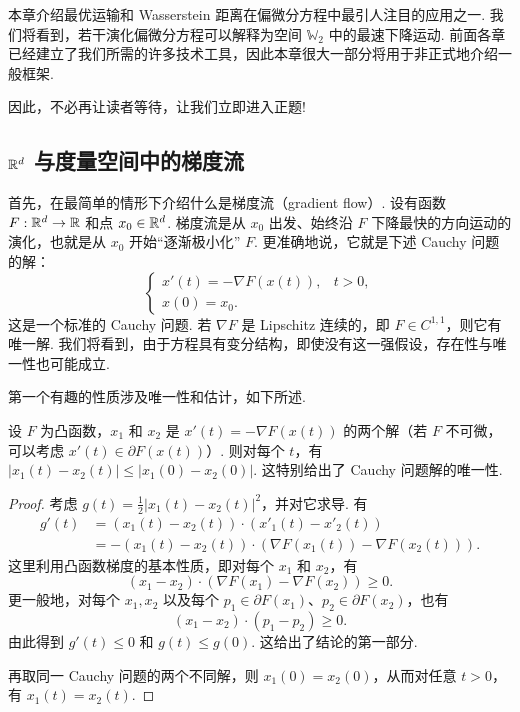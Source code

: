 本章介绍最优运输和 Wasserstein 距离在偏微分方程中最引人注目的应用之一. 我们将看到，若干演化偏微分方程可以解释为空间 $\mathbb W_2$ 中的最速下降运动. 前面各章已经建立了我们所需的许多技术工具，因此本章很大一部分将用于非正式地介绍一般框架.

因此，不必再让读者等待，让我们立即进入正题!

\subsection[欧氏空间与度量空间中的梯度流]{$\mathbb R^d$ 与度量空间中的梯度流}\label{sec:8.1}
首先，在最简单的情形下介绍什么是梯度流（gradient flow）. 设有函数 $F:\mathbb R^d\to\mathbb R$ 和点 $x_0\in\mathbb R^d$. 梯度流是从 $x_0$ 出发、始终沿 $F$ 下降最快的方向运动的演化，也就是从 $x_0$ 开始“逐渐极小化” $F$. 更准确地说，它就是下述 Cauchy 问题的解：
\[
\begin{cases}
x'(t)=-\nabla F(x(t)),&t>0,\\
x(0)=x_0.
\end{cases}
\]
这是一个标准的 Cauchy 问题. 若 $\nabla F$ 是 Lipschitz 连续的，即 $F\in C^{1,1}$，则它有唯一解. 我们将看到，由于方程具有变分结构，即使没有这一强假设，存在性与唯一性也可能成立.

第一个有趣的性质涉及唯一性和估计，如下所述.

\begin{proposition}\label{obj:8.1}
设 $F$ 为凸函数，$x_1$ 和 $x_2$ 是 $x'(t)=-\nabla F(x(t))$ 的两个解（若 $F$ 不可微，可以考虑 $x'(t)\in\partial F(x(t))$）. 则对每个 $t$，有 $|x_1(t)-x_2(t)|\leq |x_1(0)-x_2(0)|$. 这特别给出了 Cauchy 问题解的唯一性.
\end{proposition}
\begin{proof}
考虑 $g(t)=\frac12|x_1(t)-x_2(t)|^2$，并对它求导. 有
\[
\begin{aligned}
g'(t)&=(x_1(t)-x_2(t))\cdot(x'_1(t)-x'_2(t))\\
&=-(x_1(t)-x_2(t))\cdot(\nabla F(x_1(t))-\nabla F(x_2(t))).
\end{aligned}
\]
这里利用凸函数梯度的基本性质，即对每个 $x_1$ 和 $x_2$，有
\[
(x_1-x_2)\cdot(\nabla F(x_1)-\nabla F(x_2))\geq 0.
\]
更一般地，对每个 $x_1,x_2$ 以及每个 $p_1\in\partial F(x_1)$、$p_2\in\partial F(x_2)$，也有
\[
(x_1-x_2)\cdot(p_1-p_2)\geq 0.
\]
由此得到 $g'(t)\leq 0$ 和 $g(t)\leq g(0)$. 这给出了结论的第一部分.

再取同一 Cauchy 问题的两个不同解，则 $x_1(0)=x_2(0)$，从而对任意 $t>0$，有 $x_1(t)=x_2(t)$.
\end{proof}

